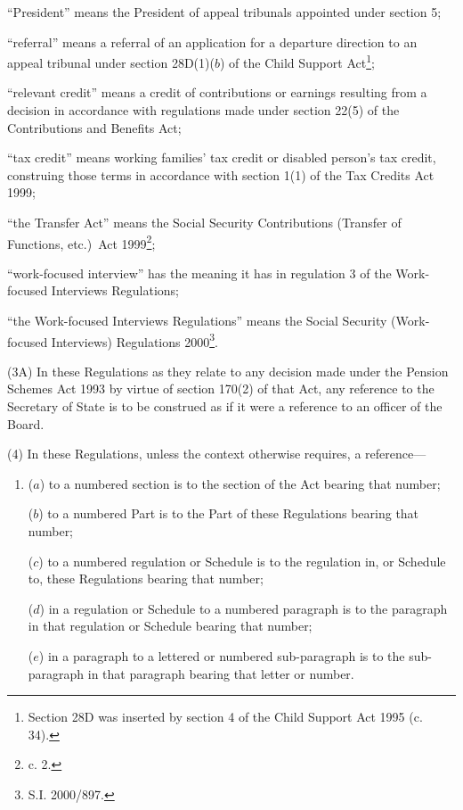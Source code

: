 \documentclass[12pt,a4paper]{article}
\begin{document}
\begin{enumerate}
“President” means the President of appeal tribunals appointed under section 5;

“referral” means a referral of an application for a departure direction to an appeal tribunal under section 28D(1)($b$) of the Child Support Act\footnote{\frenchspacing Section 28D was inserted by section 4 of the Child Support Act 1995 (c. 34).};

“relevant credit” means a credit of contributions or earnings resulting from a decision in accordance with regulations made under section 22(5) of the Contributions and Benefits Act;

“tax credit” means working families' tax credit or disabled person’s tax credit, construing those terms in accordance with section 1(1) of the Tax Credits Act 1999;

“the Transfer Act” means the Social Security Contributions (Transfer of Functions, etc.)\ Act 1999\footnote{ c. 2.};

“work-focused interview” has the meaning it has in regulation 3 of the Work-focused Interviews Regulations;

\pagebreak[3]

    “the Work-focused Interviews Regulations” means the Social Security (Work-focused Interviews) Regulations 2000\footnote{\frenchspacing S.I. 2000/897.}.
\end{enumerate}

(3A) In these Regulations as they relate to any decision made under the Pension Schemes Act 1993 by virtue of section 170(2) of that Act, any reference to the Secretary of State is to be construed as if it were a reference to an officer of the Board.

(4) In these Regulations, unless the context otherwise requires, a reference—
\begin{enumerate}\item[]
($a$) to a numbered section is to the section of the Act bearing that number;

($b$) to a numbered Part is to the Part of these Regulations bearing that number;

($c$) to a numbered regulation or Schedule is to the regulation in, or Schedule to, these Regulations bearing that number;

($d$) in a regulation or Schedule to a numbered paragraph is to the paragraph in that regulation or Schedule bearing that number;

($e$) in a paragraph to a lettered or numbered sub-paragraph is to the sub-paragraph in that paragraph bearing that letter or number.
\end{enumerate}
\end{document}
